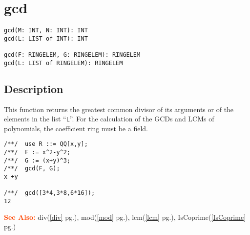 \documentclass[a4paper]{mybook}
\newenvironment{command}{}{} %
\newcommand\SeeAlso{\par\textcolor{OrangeRed}{\textbf{\large See Also: }}}
\begin{document}
\section{gcd}
\label{gcd}
\begin{command} %


\begin{Verbatim}[label=syntax, rulecolor=\color{MidnightBlue},
frame=single]
gcd(M: INT, N: INT): INT
gcd(L: LIST of INT): INT

gcd(F: RINGELEM, G: RINGELEM): RINGELEM
gcd(L: LIST of RINGELEM): RINGELEM
\end{Verbatim}


\subsection*{Description}

This function returns the greatest common divisor of its arguments
or of the elements in the list ``\verb&L&''.
For the calculation of the GCDs and LCMs of polynomials, the
coefficient ring must be a field.
\begin{Verbatim}[label=example, rulecolor=\color{PineGreen}, frame=single]
/**/  use R ::= QQ[x,y];
/**/  F := x^2-y^2;
/**/  G := (x+y)^3;
/**/  gcd(F, G);
x +y

/**/  gcd([3*4,3*8,6*16]);
12
\end{Verbatim}


\SeeAlso %
  div(\ref{div} pg.\pageref{div}), 
    mod(\ref{mod} pg.\pageref{mod}), 
    lcm(\ref{lcm} pg.\pageref{lcm}), 
    IsCoprime(\ref{IsCoprime} pg.\pageref{IsCoprime})
\end{command} %
\end{document}
